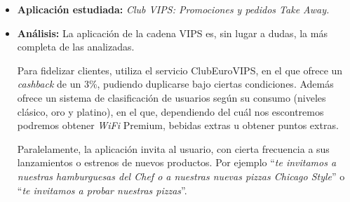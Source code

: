 \documentclass[twoside]{report}
\begin{document}
\begin{itemize}
\item \textbf{Aplicación estudiada:} \cite{vipsapp} \textit{Club VIPS: Promociones y pedidos Take Away.}
\item \textbf{Análisis:} 
La aplicación de la cadena VIPS es, sin lugar a dudas, la más completa de las analizadas.

Para fidelizar clientes, utiliza el servicio ClubEuroVIPS, en el que ofrece un \textit{cashback} de un 3\%, pudiendo duplicarse bajo ciertas condiciones. Además ofrece un sistema de clasificación de usuarios según su consumo (niveles clásico, oro y platino), en el que, dependiendo del cuál nos escontremos podremos obtener \textit{WiFi} Premium, bebidas extras u obtener puntos extras.

Paralelamente, la aplicación invita al usuario, con cierta frecuencia a sus lanzamientos o estrenos de nuevos productos. Por ejemplo “\textit{te invitamos a nuestras hamburguesas del Chef o a nuestras nuevas pizzas Chicago Style}” o “\textit{te invitamos a probar nuestras pizzas}”.


\end{itemize}
\end{document}

